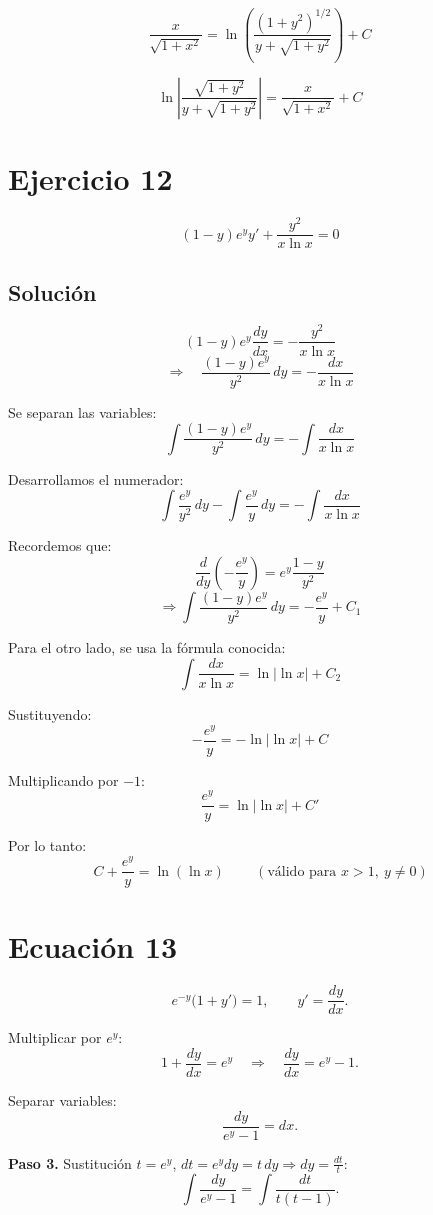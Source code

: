 \documentclass[12pt,a4paper]{article}
\begin{document}
\begin{multicols}{2}
\[
\frac{x}{\sqrt{1+x^2}} = \ln\!\left(\frac{(1+y^2)^{1/2}}{y+\sqrt{1+y^2}}\right) + C
\]

\[
\boxed{
\ln\left\lvert
\frac{\sqrt{1+y^2}}{y+\sqrt{1+y^2}}
\right\rvert
=
\frac{x}{\sqrt{1+x^2}} + C
}
\]


\section*{Ejercicio 12}
\[(1-y)e^yy\prime+\frac{y^2}{x\ln x}=0\]

\subsection*{Solución}
\[
(1-y)e^{y}\frac{dy}{dx} = -\frac{y^{2}}{x\ln x}
\]
\[
\Rightarrow\quad
\frac{(1-y)e^{y}}{y^{2}}\,dy = -\frac{dx}{x\ln x}
\]

\noindent
Se separan las variables:
\[
\int \frac{(1-y)e^{y}}{y^{2}}\,dy = -\int \frac{dx}{x\ln x}
\]

\noindent
Desarrollamos el numerador:
\[
\int \frac{e^{y}}{y^{2}}\,dy - \int \frac{e^{y}}{y}\,dy = -\int \frac{dx}{x\ln x}
\]

\noindent
Recordemos que:
\[
\frac{d}{dy}\left(-\frac{e^{y}}{y}\right)=e^{y}\frac{1-y}{y^{2}}
\]
\[
\Rightarrow 
\int \frac{(1-y)e^{y}}{y^{2}}\,dy = -\frac{e^{y}}{y} + C_1
\]
\columnbreak

\noindent
Para el otro lado, se usa la fórmula conocida:
\[
\int \frac{dx}{x\ln x} = \ln|\ln x| + C_2
\]

\noindent
Sustituyendo:
\[
-\frac{e^{y}}{y} = -\ln|\ln x| + C
\]

\noindent
Multiplicando por $-1$:
\[
\frac{e^{y}}{y} = \ln|\ln x| + C'
\]

\noindent
Por lo tanto:
\[
\boxed{\,C + \frac{e^{y}}{y} = \ln(\ln x)\,}
\qquad (\text{válido para }x>1,\ y\neq0)
\]


\section*{Ecuación 13}
	\[
	e^{-y}\bigl(1+y'\bigr)=1,\qquad y'=\frac{dy}{dx}.
	\]
	
	Multiplicar por \(e^{y}\):
	\[
	1+\frac{dy}{dx}=e^{y}\quad\Rightarrow\quad \frac{dy}{dx}=e^{y}-1.
	\]
	
	Separar variables:
	\[
	\frac{dy}{e^{y}-1}=dx.
	\]
	
	\textbf{Paso 3.} Sustitución \(t=e^{y}\), \(dt=e^{y}dy=t\,dy\Rightarrow dy=\frac{dt}{t}\):
	\[
	\int\frac{dy}{e^{y}-1}=\int\frac{dt}{t(t-1)}.
	\]
	

\end{multicols}
\end{document}
